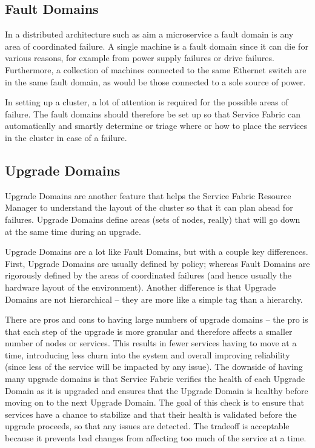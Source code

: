 \subsection{Fault Domains}
In a distributed architecture such as aim a microservice a fault
domain is any area of coordinated failure. A single machine is a fault
domain since it can die for various reasons, for example from power
supply failures or drive failures. Furthermore, a collection of
machines connected to the same Ethernet switch are in the same fault
domain, as would be those connected to a sole source of power.

In setting up a cluster, a lot of attention is required for the
possible areas of failure. The fault domains should therefore be set
up so that Service Fabric can automatically and smartly determine or
triage where or how to place the services in the cluster in case of a
failure.

\subsection{Upgrade Domains}
Upgrade Domains are another feature that helps the Service Fabric
Resource Manager to understand the layout of the cluster so that it
can plan ahead for failures. Upgrade Domains define areas (sets of
nodes, really) that will go down at the same time during an upgrade.

Upgrade Domains are a lot like Fault Domains, but with a couple key
differences. First, Upgrade Domains are usually defined by policy;
whereas Fault Domains are rigorously defined by the areas of
coordinated failures (and hence usually the hardware layout of the
environment). Another difference is that Upgrade Domains are not
hierarchical – they are more like a simple tag than a hierarchy.

There are pros and cons to having large numbers of upgrade domains –
the pro is that each step of the upgrade is more granular and
therefore affects a smaller number of nodes or services. This results
in fewer services having to move at a time, introducing less churn
into the system and overall improving reliability (since less of the
service will be impacted by any issue). The downside of having many
upgrade domains is that Service Fabric verifies the health of each
Upgrade Domain as it is upgraded and ensures that the Upgrade Domain
is healthy before moving on to the next Upgrade Domain. The goal of
this check is to ensure that services have a chance to stabilize and
that their health is validated before the upgrade proceeds, so that
any issues are detected. The tradeoff is acceptable because it
prevents bad changes from affecting too much of the service at a time.

